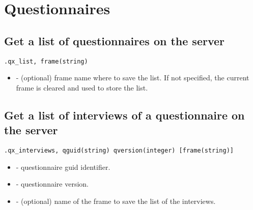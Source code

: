 \section{Questionnaires}

\subsection{Get a list of questionnaires on the server}
\begin{lstlisting}[style=CommandLineStyle]
.qx_list, frame(string)
\end{lstlisting}

\optsheader
\begin{itemize}
  \item {} - (optional) frame name where to save the list. If not specified, the current frame is cleared and used to store the list.
\end{itemize}

\begin{compactitem}
\end{compactitem}


\subsection{Get a list of interviews of a questionnaire on the server}
\begin{lstlisting}[style=CommandLineStyle]
.qx_interviews, qguid(string) qversion(integer) [frame(string)]
\end{lstlisting}

\optsheader
\begin{itemize}
  \item {} - questionnaire guid identifier.
  \item {} - questionnaire version.
  \item {} - (optional) name of the frame to save the list of the interviews.
\end{itemize}

\begin{compactitem}
\end{compactitem}



